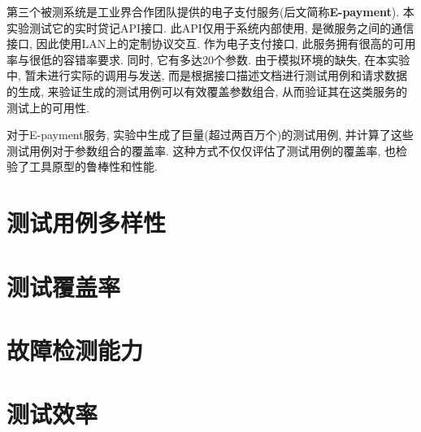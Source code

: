         第三个被测系统是工业界合作团队提供的电子支付服务(后文简称\textbf{E-payment}). 本实验测试它的实时贷记API接口. 此API仅用于系统内部使用, 是微服务之间的通信接口, 因此使用LAN上的定制协议交互. 作为电子支付接口, 此服务拥有很高的可用率与很低的容错率要求. 同时, 它有多达20个参数. 由于模拟环境的缺失, 在本实验中, 暂未进行实际的调用与发送, 而是根据接口描述文档进行测试用例和请求数据的生成, 来验证生成的测试用例可以有效覆盖参数组合, 从而验证其在这类服务的测试上的可用性.
        
        对于E-payment服务, 实验中生成了巨量(超过两百万个)的测试用例, 并计算了这些测试用例对于参数组合的覆盖率. 这种方式不仅仅评估了测试用例的覆盖率, 也检验了工具原型的鲁棒性和性能.
        
    
    \section{测试用例多样性}
    
    \section{测试覆盖率}
    
    \section{故障检测能力}
    
    \section{测试效率}

